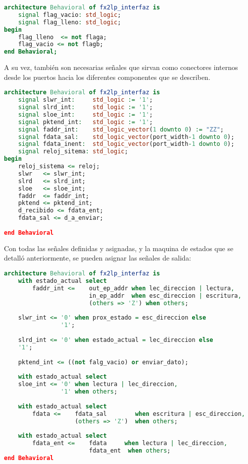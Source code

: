 \begin{lstlisting}[language=VHDL,backgroundcolor=\color{gray!30}]
architecture Behavioral of fx2lp_interfaz is
	signal flag_vacio: std_logic;
	signal flag_lleno: std_logic;
begin
	flag_lleno  <= not flaga;
	flag_vacio <= not flagb;
end Behavioral;	
\end{lstlisting}

A su vez, también son necesarias señales que sirvan como conectores internos desde los puertos hacia los diferentes componentes que se describen.

\begin{lstlisting}[language=VHDL,backgroundcolor=\color{gray!30}]
architecture Behavioral of fx2lp_interfaz is
	signal slwr_int:  	 std_logic := '1';
	signal slrd_int:  	 std_logic := '1';
	signal sloe_int:  	 std_logic := '1';
	signal pktend_int:	 std_logic := '1';
	signal faddr_int:	 std_logic_vector(1 downto 0) := "ZZ";
	signal fdata_sal:	 std_logic_vector(port_width-1 downto 0);
	signal fdata_inent:	 std_logic_vector(port_width-1 downto 0);
	signal reloj_sitema: std_logic;
begin
	reloj_sistema <= reloj;
	slwr   <= slwr_int;
	slrd   <= slrd_int;
	sloe   <= sloe_int;
	faddr  <= faddr_int;
	pktend <= pktend_int;
	d_recibido <= fdata_ent;
	fdata_sal <= d_a_enviar;
	
end Behavioral
\end{lstlisting}

Con todas las señales definidas y asignadas, y la maquina de estados que se detalló anteriormente, se pueden asignar las señales de salida:

\begin{lstlisting}[language=VHDL,backgroundcolor=\color{gray!30}]
architecture Behavioral of fx2lp_interfaz is
	with estado_actual select
		faddr_int <=	out_ep_addr when lec_direccion | lectura,
						in_ep_addr  when esc_direccion | escritura,
						(others => 'Z') when others;
	
	slwr_int <=	'0' when prox_estado = esc_direccion else
				'1';
	
	slrd_int <= '0' when estado_actual = lec_direccion else
	'1';
	
	pktend_int <= ((not falg_vacio) or enviar_dato);
	
	with estado_actual select
	sloe_int <=	'0' when lectura | lec_direccion,
				'1' when others;
	
	with estado_actual select
		fdata <=	fdata_sal        when escritura | esc_direccion,
					(others => 'Z')  when others;
	
	with estado_actual select
		fdata_ent <=	fdata     when lectura | lec_direccion,
						fdata_ent  when others;
end Behavioral
\end{lstlisting}

